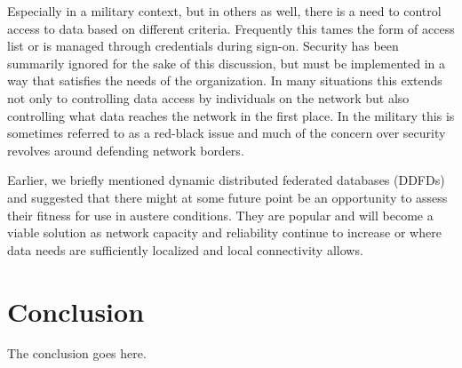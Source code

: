 \documentclass[10pt]{./IEEEtran}
\begin{document}
Especially in a military context, but in others as well, there is a need to control access to data based on different criteria.  Frequently this tames the form of access list or is managed through credentials during sign-on.  Security has been summarily ignored for the sake of this discussion, but must be implemented in a way that satisfies the needs of the organization.  In many situations this extends not only to controlling data access by individuals on the network but also controlling what data reaches the network in the first place.  In the military this is sometimes referred to as a red-black issue and much of the concern over security revolves around defending network borders.
	
Earlier, we briefly mentioned dynamic distributed federated databases (DDFDs) and suggested that there might at some future point be an opportunity to assess their fitness for use in austere conditions.  They are popular and will become a viable solution as network capacity and reliability continue to increase or where data needs are sufficiently localized and local connectivity allows.

\section{Conclusion}
\label{sec:conclusion}
The conclusion goes here.


%
%

\end{document}
